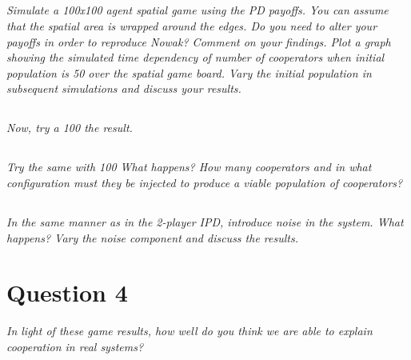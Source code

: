 \documentclass{article}
\begin{document}
\subsection{ }
\textit{Simulate a 100x100 agent spatial game using the PD payoffs. You can assume that the spatial
area is wrapped around the edges. Do you need to alter your payoffs in order to reproduce
Nowak? Comment on your findings. Plot a graph showing the simulated time dependency of
number of cooperators when initial population is 50%
over the spatial game board. Vary the initial population in subsequent simulations and discuss
your results.}

\subsection{ }
\textit{Now, try a 100%
the result.}

\subsection{ }
\textit{Try the same with 100%
What happens? How many cooperators and in what configuration must they be injected to
produce a viable population of cooperators?}

\subsection{ }
\textit{In the same manner as in the 2-player IPD, introduce noise in the system. What happens? Vary
the noise component and discuss the results.}


\section{Question 4}
\textit{In light of these game results, how well do you think we are able to explain cooperation in real systems?}
\end{document}
